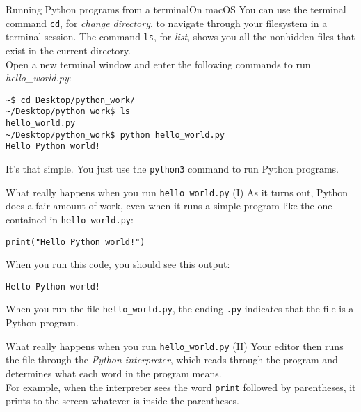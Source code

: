 \documentclass[aspectratio=169]{beamer}
\begin{document}
\begin{frame}[fragile]{Running Python programs from a terminal}{On macOS}
    You can use the terminal command \texttt{cd}, for \textit{change directory}, to navigate through your filesystem in a terminal session.
    The command \texttt{ls}, for \textit{list}, shows you all the nonhidden files that exist in the current directory. \\
    \vspace{10pt}
    Open a new terminal window and enter the following commands to run \textit{hello\_world.py}:
    \vspace{5pt}
    \begin{Verbatim}[fontsize=\footnotesize]
~$ cd Desktop/python_work/
~/Desktop/python_work$ ls
hello_world.py
~/Desktop/python_work$ python hello_world.py
Hello Python world!
    \end{Verbatim}
    \vspace{10pt}
    It's that simple.
    You just use the \texttt{python3} command to run Python programs.
\end{frame}


\begin{frame}[fragile]{What really happens when you run \texttt{hello\_world.py} (I)}
    As it turns out, Python does a fair amount of work, even when it runs a simple program like the one contained in \texttt{hello\_world.py}:
    \vspace{5pt}
    \begin{Verbatim}[fontsize=\footnotesize]
print("Hello Python world!") 
    \end{Verbatim}
    \vspace{15pt}
    When you run this code, you should see this output:
    \vspace{5pt}
    \begin{Verbatim}[fontsize=\footnotesize]
Hello Python world!
    \end{Verbatim}
    \vspace{15pt}
    When you run the file \texttt{hello\_world.py}, the ending \texttt{.py} indicates that the file is a Python program. \\
\end{frame}


\begin{frame}[fragile]{What really happens when you run \texttt{hello\_world.py} (II)}
    Your editor then runs the file through the \textit{Python interpreter}, which reads through the program and determines what each word in the program means. \\
    \vspace{15pt}
    For example, when the interpreter sees the word \texttt{print} followed by parentheses, it prints to the screen whatever is inside the parentheses. \\
\end{frame}
\end{document}
